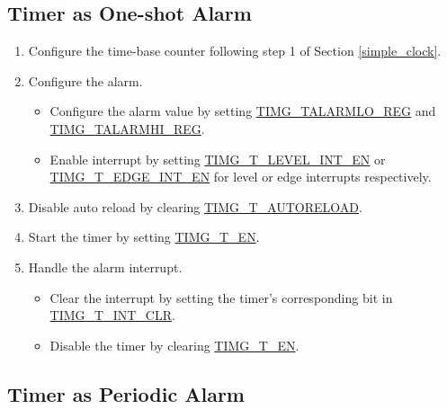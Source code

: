 \documentclass[main\_\_EN.tex]{subfiles}
\begin{document}
\subsection{Timer as One-shot Alarm}\label{Timer_Alarm}
\begin{enumerate}
    \item Configure the time-base counter following step 1 of Section \ref{simple_clock}.
    \item Configure the alarm.
    \begin{itemize}
        \item Configure the alarm value by setting \hyperref[regdesc:TIMGTXALARMLOREG]{TIMG\_TALARMLO\_REG} and \hyperref[regdesc:TIMGTXALARMHIREG]{TIMG\_TALARMHI\_REG}.
        \item Enable interrupt by setting  \hyperref[fielddesc:TIMGTXLEVELINTEN]{TIMG\_T\_LEVEL\_INT\_EN} or \hyperref[fielddesc:TIMGTXEDGEINTEN]{TIMG\_T\_EDGE\_INT\_EN} for level or edge interrupts respectively.
    \end{itemize}
    \item Disable auto reload by clearing \hyperref[fielddesc:TIMGTXAUTORELOAD]{TIMG\_T\_AUTORELOAD}.
    \item Start the timer by setting \hyperref[fielddesc:TIMGTXEN]{TIMG\_T\_EN}.
    \item Handle the alarm interrupt.
    \begin{itemize}
        \item Clear the interrupt by setting the timer's corresponding bit in \hyperref[fielddesc:TIMGTXINTCLR]{TIMG\_T\_INT\_CLR}.
        \item Disable the timer by clearing \hyperref[fielddesc:TIMGTXEN]{TIMG\_T\_EN}.
    \end{itemize}
\end{enumerate}
\newpage
\subsection{Timer as Periodic Alarm}
\end{document}
